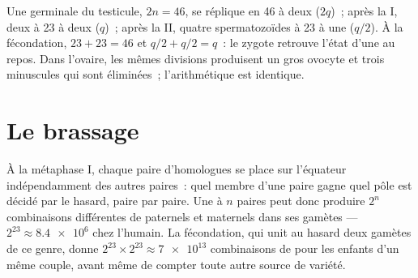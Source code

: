 \begin{example}\label{ex:g12:meiosis-genetic-shuffling:numbers}
Une  germinale du testicule, $2n = 46$, se réplique en 46
 à deux  ($2q$)~; après la  I, deux
 à 23  à deux  ($q$)~; après la 
II, quatre spermatozoïdes à 23  à une  ($q/2$). À
la fécondation, $23 + 23 =
46$ et $q/2 + q/2 = q$~: le zygote retrouve l'état d'une 
 au repos. Dans l'ovaire, les mêmes divisions produisent un
gros ovocyte et trois  minuscules qui sont éliminées~;
l'arithmétique est identique.
\end{example}

\section{Le brassage}

\begin{proposition}\label{prop:g12:meiosis-genetic-shuffling:assortment}
À la métaphase I, chaque paire d'homologues se place sur l'équateur
indépendamment des autres paires~: quel membre d'une paire gagne quel
pôle est décidé par le hasard, paire par paire. Une  à $n$
paires peut donc produire $2^n$ combinaisons différentes de 
paternels et maternels dans ses gamètes --- $2^{23} \approx \num{8.4e6}$
chez l'humain. La fécondation, qui unit au hasard deux
gamètes de ce genre, donne $2^{23}
\times 2^{23} \approx \num{7e13}$ combinaisons de  pour les
enfants d'un même couple, avant même de compter toute autre source de
variété.
\end{proposition}
\admitted

